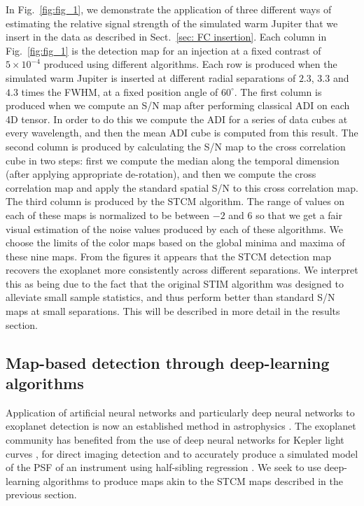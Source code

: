 \documentclass{aa}
\begin{document}
In Fig.~\ref{fig:fig_1}, we demonstrate the application of three different ways of estimating the relative signal strength of the simulated warm Jupiter that we insert in the data as described in Sect.~\ref{sec: FC insertion}.
Each column in Fig.~\ref{fig:fig_1} is the detection map for an injection at a fixed contrast of $5\times 10^{-4}$ produced using different algorithms. %
Each row is produced when the simulated warm Jupiter is inserted at different radial separations of $2.3$, $3.3$ and $4.3$ times the FWHM, at a fixed position angle of $60^{\circ}$.
The first column is produced when we compute an S/N map \citep[as defined in][]{2014Mawet} after performing classical ADI on each 4D tensor.
In order to do this we compute the ADI for a series of data cubes at every wavelength, and then the mean ADI cube is computed from this result. 
The second column is produced by calculating the S/N map \citep[as defined in][]{2014Mawet} to the cross correlation cube in two steps: first we compute the median along the temporal dimension (after applying appropriate de-rotation), and then we compute the cross correlation map and apply the standard spatial S/N to this cross correlation map.
The third column is produced by the STCM algorithm.
The range of values on each of these maps is normalized to be between $-2$ and $6$ so that we get a fair visual estimation of the noise values produced by each of these algorithms.
We choose the limits of the color maps based on the global minima and maxima of these nine maps.
From the figures it appears that the STCM detection map recovers the exoplanet more consistently across different separations. We interpret this as being due to the fact that the original STIM algorithm was designed to alleviate small sample statistics, and thus perform better than standard S/N maps at small separations.
This will be described in more detail in the results section.

\subsection{Map-based detection through deep-learning algorithms}\label{sec:ML algorithms}

Application of artificial neural networks and particularly deep neural networks to exoplanet detection is now an established method in astrophysics \citep[][]{2020Fluke}.
The exoplanet community has benefited from the use of deep neural networks for Kepler light curves \cite{2018Pearson}, for direct imaging detection \cite{2018Gomez} and to accurately produce a simulated model of the PSF of an instrument using half-sibling regression \citep{2022Gebhard}.
We seek to use deep-learning algorithms to produce maps akin to the STCM maps described in the previous section.
\end{document}
